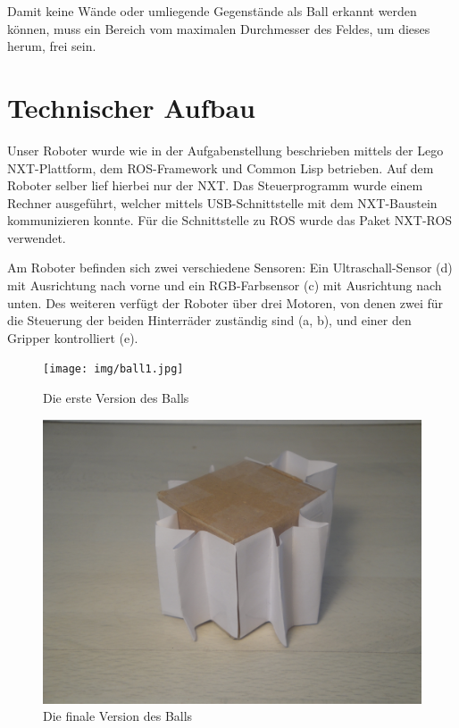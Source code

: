 \documentclass{fetch-my-doc}
\begin{document}
      
    Damit keine Wände oder umliegende Gegenstände als Ball erkannt werden können, muss ein Bereich vom maximalen Durchmesser des Feldes, um dieses herum, frei sein.

	\section{Technischer Aufbau}\label{sec:Aufbau}
    Unser Roboter wurde wie in der Aufgabenstellung beschrieben mittels der Lego NXT-Plattform, dem ROS-Framework und Common Lisp betrieben. Auf dem Roboter selber lief hierbei nur der NXT. Das Steuerprogramm wurde einem Rechner ausgeführt, welcher mittels USB-Schnittstelle mit dem NXT-Baustein kommunizieren konnte. Für die Schnittstelle zu ROS wurde das Paket NXT-ROS verwendet.

  Am Roboter befinden sich zwei verschiedene Sensoren: Ein Ultraschall-Sensor (d) mit Ausrichtung nach vorne und ein RGB-Farbsensor (c) mit Ausrichtung nach unten. Des weiteren verfügt der Roboter über drei Motoren, von denen zwei für die Steuerung der beiden Hinterräder zuständig sind (a, b), und einer den Gripper kontrolliert (e).
    
    \begin{center}
      \begin{minipage}[t]{.49\textwidth}
        \begin{figure}[H]%
          \centering%
          \caption{Die erste Version des Balls}%
          \label{}%
          \texttt{[image: img/ball1.jpg]}%
        \end{figure}
      \end{minipage}
      \hfill
      \begin{minipage}[t]{.49\textwidth}
        \begin{figure}[H]%
          \centering%
          \caption{Die finale Version des Balls}%
          \label{}%
          \includegraphics[width=\columnwidth]{img/ball2.jpg}%
        \end{figure}
      \end{minipage}
    \end{center}
    
\end{document}
